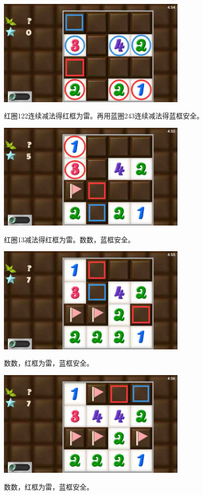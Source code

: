 \subsection{} %
\begin{center}
    \includegraphics[width=0.7\textwidth]{puzzlelow/55-1.jpg}
\end{center}
红圈122连续减法得红框为雷。再用蓝圈243连续减法得蓝框安全。
\begin{center}
    \includegraphics[width=0.7\textwidth]{puzzlelow/55-2.jpg}
\end{center}
红圈13减法得红框为雷。数数，蓝框安全。
\begin{center}
    \includegraphics[width=0.7\textwidth]{puzzlelow/55-3.jpg}
\end{center}
数数，红框为雷，蓝框安全。
\begin{center}
    \includegraphics[width=0.7\textwidth]{puzzlelow/55-4.jpg}
\end{center}
数数，红框为雷，蓝框安全。

